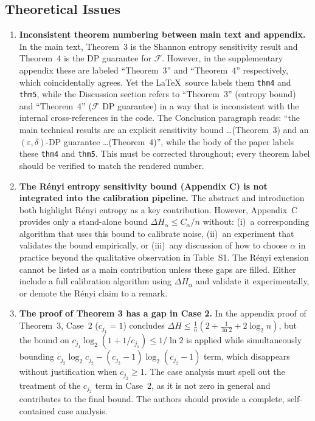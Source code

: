 \documentclass[12pt]{article}
\begin{document}
\subsection{Theoretical Issues}

\begin{enumerate}[label=\textbf{M\arabic*.}, leftmargin=*, wide=0pt]

\item \textbf{Inconsistent theorem numbering between main text and appendix.}
In the main text, Theorem~3 is the Shannon entropy sensitivity result and Theorem~4 is the DP guarantee for $\mathcal{F}$. However, in the supplementary appendix these are labeled ``Theorem~3'' and ``Theorem~4'' respectively, which coincidentally agrees. Yet the \LaTeX\ source labels them \texttt{thm4} and \texttt{thm5}, while the Discussion section refers to ``Theorem~3'' (entropy bound) and ``Theorem~4'' ($\mathcal{F}$ DP guarantee) in a way that is inconsistent with the internal cross-references in the code. The Conclusion paragraph reads: ``the main technical results are an explicit sensitivity bound \ldots (Theorem~3) and an $(\varepsilon,\delta)$-DP guarantee \ldots (Theorem~4)'', while the body of the paper labels these \texttt{thm4} and \texttt{thm5}. This must be corrected throughout; every theorem label should be verified to match the rendered number.

\item \textbf{The Rényi entropy sensitivity bound (Appendix C) is not integrated into the calibration pipeline.}
The abstract and introduction both highlight Rényi entropy as a key contribution. However, Appendix~C provides only a stand-alone bound $\Delta H_\alpha \leq C_\alpha / n$ without: (i)~a corresponding algorithm that uses this bound to calibrate noise, (ii)~an experiment that validates the bound empirically, or (iii)~any discussion of how to choose $\alpha$ in practice beyond the qualitative observation in Table~S1. The Rényi extension cannot be listed as a main contribution unless these gaps are filled. Either include a full calibration algorithm using $\Delta H_\alpha$ and validate it experimentally, or demote the R\'{e}nyi claim to a remark.

\item \textbf{The proof of Theorem 3 has a gap in Case 2.}
In the appendix proof of Theorem~3, Case~2 ($c_{j_1} = 1$) concludes $\Delta H \leq \frac{1}{n}(2 + \frac{1}{\ln 2} + 2\log_2 n)$, but the bound on $c_{j_1}\log_2(1 + 1/c_{j_1}) \leq 1/\ln 2$ is applied while simultaneously bounding $c_{j_2}\log_2 c_{j_2} - (c_{j_2}-1)\log_2(c_{j_2}-1)$ term, which disappears without justification when $c_{j_2} \geq 1$. The case analysis must spell out the treatment of the $c_{j_2}$ term in Case~2, as it is not zero in general and contributes to the final bound. The authors should provide a complete, self-contained case analysis.


\end{enumerate}
\end{document}
